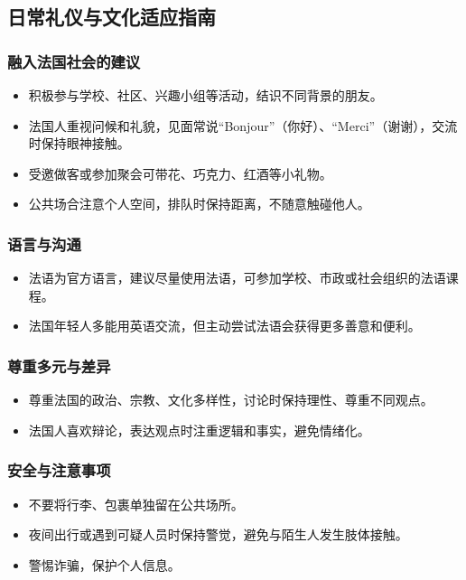 \subsection{日常礼仪与文化适应指南}

\subsubsection{融入法国社会的建议}
\begin{itemize}
    \item 积极参与学校、社区、兴趣小组等活动，结识不同背景的朋友。
    \item 法国人重视问候和礼貌，见面常说“Bonjour”（你好）、“Merci”（谢谢），交流时保持眼神接触。
    \item 受邀做客或参加聚会可带花、巧克力、红酒等小礼物。
    \item 公共场合注意个人空间，排队时保持距离，不随意触碰他人。
\end{itemize}

\subsubsection{语言与沟通}
\begin{itemize}
    \item 法语为官方语言，建议尽量使用法语，可参加学校、市政或社会组织的法语课程。
    \item 法国年轻人多能用英语交流，但主动尝试法语会获得更多善意和便利。
\end{itemize}

\subsubsection{尊重多元与差异}
\begin{itemize}
    \item 尊重法国的政治、宗教、文化多样性，讨论时保持理性、尊重不同观点。
    \item 法国人喜欢辩论，表达观点时注重逻辑和事实，避免情绪化。
\end{itemize}

\subsubsection{安全与注意事项}
\begin{itemize}
    \item 不要将行李、包裹单独留在公共场所。
    \item 夜间出行或遇到可疑人员时保持警觉，避免与陌生人发生肢体接触。
    \item 警惕诈骗，保护个人信息。
\end{itemize}

